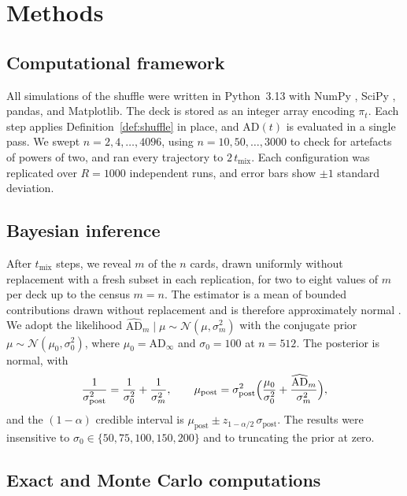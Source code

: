 \documentclass[ba,preprint]{imsart}
\theoremstyle{plain}
\theoremstyle{definition}
\newcommand{\AD}{\mathrm{AD}}
\newcommand{\ADh}{\widehat{\mathrm{AD}}}
\begin{document}
\section{Methods}\label{sec:methods}

\subsection{Computational framework}

All simulations of the shuffle were written in Python~3.13 with NumPy \citep{Harris2020}, SciPy \citep{Virtanen2020}, pandas, and Matplotlib. The deck is stored as an integer array encoding $\pi_t$. Each step applies Definition~\ref{def:shuffle} in place, and $\AD(t)$ is evaluated in a single pass. We swept $n=2,4,\dots,4096$, using $n=10,50,\dots,3000$ to check for artefacts of powers of two, and ran every trajectory to $2\,t_{\mathrm{mix}}$. Each configuration was replicated over $R=1000$ independent runs, and error bars show $\pm1$ standard deviation.

\subsection{Bayesian inference}\label{sec:bayes-methods}

After $t_{\mathrm{mix}}$ steps, we reveal $m$ of the $n$ cards, drawn uniformly without replacement with a fresh subset in each replication, for two to eight values of $m$ per deck up to the census $m=n$. The estimator is a mean of bounded contributions drawn without replacement and is therefore approximately normal \citep{Hajek1960}. We adopt the likelihood $\ADh_m\mid\mu\sim\mathcal N(\mu,\sigma_m^2)$ with the conjugate prior $\mu\sim\mathcal N(\mu_0,\sigma_0^2)$, where $\mu_0=\AD_\infty$ and $\sigma_0=100$ at $n=512$. The posterior is normal, with
\begin{equation}\label{eq:posterior}
\frac{1}{\sigma_{\mathrm{post}}^2}=\frac{1}{\sigma_0^2}+\frac{1}{\sigma_m^2},\qquad
\mu_{\mathrm{post}}=\sigma_{\mathrm{post}}^2\Bigl(\frac{\mu_0}{\sigma_0^2}+\frac{\ADh_m}{\sigma_m^2}\Bigr),
\end{equation}
and the $(1-\alpha)$ credible interval is $\mu_{\mathrm{post}}\pm z_{1-\alpha/2}\,\sigma_{\mathrm{post}}$. The results were insensitive to $\sigma_0\in\{50,75,100,150,200\}$ and to truncating the prior at zero.

\subsection{Exact and Monte Carlo computations}
\end{document}
